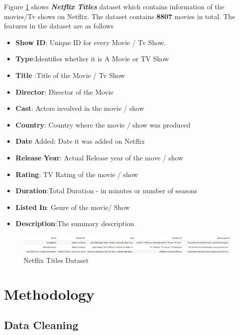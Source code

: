 \documentclass[a4paper,10pt]{article}
\begin{document}
\vspace{10pt}
Figure \ref{netflix titles} shows \textbf{\textit{Netflix Titles}} dataset which contains  information of the movies/Tv shows on Netflix. The dataset contains \textbf{8807} movies in total. The features in the dataset are as follows 
\begin{itemize}
    \item \textbf{Show ID}: Unique ID for every Movie / Tv Show. 
    \item \textbf{Type}:Identifies whether it is A Movie or TV Show 
    \item \textbf{Title} :Title of the Movie / Tv Show 
    \item \textbf{Director}: Director of the Movie
    \item \textbf{Cast}: Actors involved in the movie / show
    \item \textbf{Country}: Country where the movie / show was produced
    \item \textbf{Date} Added: Date it was added on Netflix
    \item \textbf{Release} \textbf{Year}: Actual Release year of the move / show
    \item \textbf{Rating}: TV Rating of the movie / show
    \item \textbf{Duration}:Total Duration - in minutes or number of seasons
    \item \textbf{Listed In}: Genre of the movie/ Show
    \item \textbf{Description}:The summary description 
\end{itemize}
\begin{figure}
    \centering
    \includegraphics[width=1\linewidth]{figures/netflix_title.png}
    \caption{Netflix Titles Dataset}
    \label{netflix titles}
\end{figure}





\section{Methodology}

\subsection{Data Cleaning}
\end{document}

